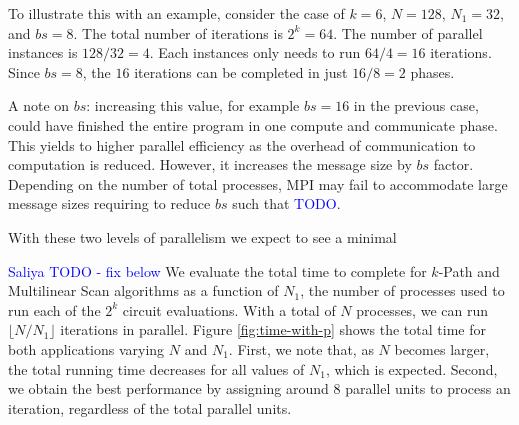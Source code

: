 To illustrate this with an example, consider the case of $k=6$, $N=128$, $N_1=32$, and $bs=8$. The total number of iterations is $2^k = 64$. The number of parallel instances is $128/32 = 4$. Each instances only needs to run $64/4 = 16$ iterations. Since $bs=8$, the $16$ iterations can be completed in just $16/8 = 2$ phases.

A note on $bs$: increasing this value, for example $bs=16$ in the previous case, could have finished the entire program in one compute and communicate phase. This yields to higher parallel efficiency as the overhead of communication to computation is reduced. However, it increases the message size by $bs$ factor. Depending on the number of total processes, MPI may fail to accommodate large message sizes requiring to reduce  $bs$ such that \textcolor{blue}{TODO}. 

With these two levels of parallelism we expect to see a minimal

\textcolor{blue}{Saliya TODO - fix below}
We evaluate the total time to complete for $k$-Path and Multilinear 
Scan algorithms as a function of $N_1$, the number of processes used to run 
each of the $2^k$ circuit evaluations. With a total of $N$ processes, we can run 
$\lfloor N / N_1 \rfloor$ iterations in parallel. Figure \ref{fig:time-with-p} shows the total time for both applications varying $N$ and $N_1$. First, we note that, as $N$ becomes larger, the total running time decreases for all values of $N_1$, which is expected. Second, we obtain the best performance by assigning around 8 parallel units to process an iteration, regardless of the total parallel units.

%


